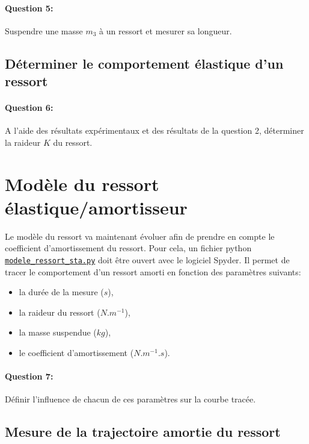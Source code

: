 \paragraph{Question 5:} Suspendre une masse $m_3$ à un ressort et mesurer sa longueur.

\subsection{Déterminer le comportement élastique d'un ressort}

\paragraph{Question 6:} A l'aide des résultats expérimentaux et des résultats de la question 2, déterminer la raideur $K$ du ressort.

\section{Modèle du ressort élastique/amortisseur}  

Le modèle du ressort va maintenant évoluer afin de prendre en compte le coefficient d'amortissement du ressort. Pour cela, un fichier python  
\href{https://github.com/Costadoat/Sciences-Ingenieur/raw/master/S01\%20Analyse\%20fonctionnelle/TP01\%20Mesures\%20physiques/Ilot_02\%20Ressort/modele_ressort_sta.py}{\texttt{modele\_ressort\_sta.py}} doit être ouvert avec le logiciel Spyder. Il permet de tracer le comportement d'un ressort amorti en fonction des paramètres suivants:
\begin{itemize}
 \item la durée de la mesure ($s$),
 \item la raideur du ressort ($N.m^{-1}$),
 \item la masse suspendue ($kg$),
 \item le coefficient d'amortissement ($N.m^{-1}.s$).
\end{itemize}

\paragraph{Question 7:} Définir l'influence de chacun de ces paramètres sur la courbe tracée.

\subsection{Mesure de la trajectoire amortie du ressort}


